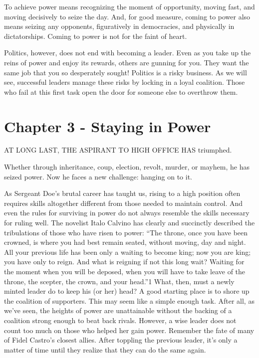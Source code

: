 \documentclass[10pt]{article}
\begin{document}
{\large To achieve power means recognizing the moment of opportunity, moving
fast, and moving decisively to seize the day. And, for good measure, coming to
power also means seizing any opponents, figuratively in democracies, and
physically in dictatorships. Coming to power is not for the faint of heart.}

{\large Politics, however, does not end with becoming a leader. Even as you take
up the reins of power and enjoy its rewards, others are gunning for you. They
want the same job that you so desperately sought! Politics is a risky business.
As we will see, successful leaders manage these risks by locking in a loyal
coalition. Those who fail at this first task open the door for someone else to
overthrow them.}
\pagebreak{}


\section{Chapter 3 - Staying in Power}

{\large AT LONG LAST, THE ASPIRANT TO HIGH OFFICE HAS triumphed.}

{\large Whether through inheritance, coup, election, revolt, murder, or mayhem,
he has seized power. Now he faces a new challenge: hanging on to it.}

{\large As Sergeant Doe's brutal career has taught us, rising to a high position
often requires skills altogether different from those needed to maintain control.
And even the rules for surviving in power do not always resemble the skills
necessary for ruling well. The novelist Italo Calvino has clearly and succinctly
described the tribulations of those who have risen to power: ``The throne, once
you have been crowned, is where you had best remain seated, without moving, day
and night. All your previous life has been only a waiting to become king; now you
are king; you have only to reign. And what is reigning if not this long wait?
Waiting for the moment when you will be deposed, when you will have to take leave
of the throne, the scepter, the crown, and your head.''1 What, then, must a newly
minted leader do to keep his (or her) head? A good starting place is to shore up
the coalition of supporters. This may seem like a simple enough task. After all,
as we've seen, the heights of power are unattainable without the backing of a
coalition strong enough to beat back rivals. However, a wise leader does not
count too much on those who helped her gain power. Remember the fate of many of
Fidel Castro's closest allies. After toppling the previous leader, it's only a
matter of time until they realize that they can do the same again.}
\end{document}
